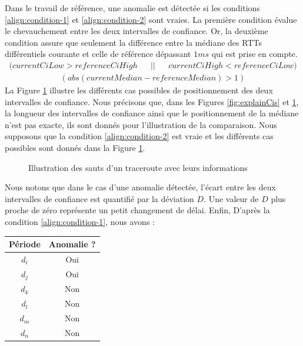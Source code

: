 Dans le travail de référence, une anomalie est détectée si les conditions \ref{align:condition-1} et \ref{align:condition-2} sont vraies. La première condition évalue le chevauchement entre les deux intervalles de confiance. Or, la deuxième condition assure que seulement la  différence entre la médiane des RTTs différentiels courante et celle de référence dépassant $1 ms$ qui est prise en compte.
\begin{align}
(currentCiLow > referenceCiHigh &&||&&   currentCiHigh <  referenceCiLow) \label{align:condition-1}
\end{align}
\begin{align}
(abs(currentMedian - referenceMedian) > 1 ) \label{align:condition-2}
\end{align}
La Figure \ref{fig:anomalies} illustre les différents cas possibles de positionnement des deux intervalles de confiance. Nous précisons que,  dans les Figures	\ref{fig:explainCis} et \ref{fig:anomalies},  la longueur des intervalles de confiance ainsi que le positionnement de la médiane n'est pas exacte, ils sont donnés pour l'illustration de la comparaison. Nous supposons que la condition \ref{align:condition-2} est vraie et les différents cas possibles sont donnés dans la Figure 	\ref{fig:anomalies}.

\begin{figure}[H]
	\centering
	\captionsetup{justification=centering}
	\resizebox{\textwidth}{!}{
		
	}
	\caption{Illustration des sauts d'un traceroute avec leurs informations}
	\label{fig:anomalies}
\end{figure}


Nous notons que dans le cas d'une anomalie détectée, l'écart entre les deux intervalles de confiance est quantifié par la déviation $D$. Une valeur de $D$ plus proche de zéro représente un petit changement de délai. Enfin, D'après la condition  \ref{align:condition-1}, nous avons :
\begin{table}[H]
	\centering
	\begin{tabular}{cc}
		\textbf{Période} & \textbf{Anomalie ?}\\ \hline
		$d_i$& Oui \\ \hline
		$d_j$ & Oui\\ \hline
		$d_k$& Non\\ \hline
		$d_l$& Non\\ \hline
		$d_m$ & Non \\ \hline
		$d_n$ & Non\\ \hline
	\end{tabular}
\end{table}

